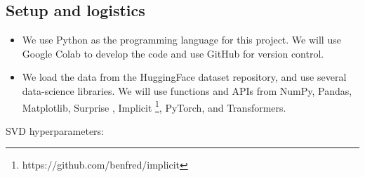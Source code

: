 \documentclass{article}
\begin{document}
\subsection{Setup and logistics}
\begin{itemize}
    \item We use Python as the programming language for this project. We will use Google Colab to develop the code and use GitHub for version control.
    \item We load the data from the HuggingFace dataset repository, and use several data-science libraries. We will use functions and APIs from NumPy, Pandas, Matplotlib, Surprise \cite{surprise}, Implicit \footnote{https://github.com/benfred/implicit}, PyTorch, and Transformers.
    
\end{itemize}
SVD hyperparameters:
\end{document}
